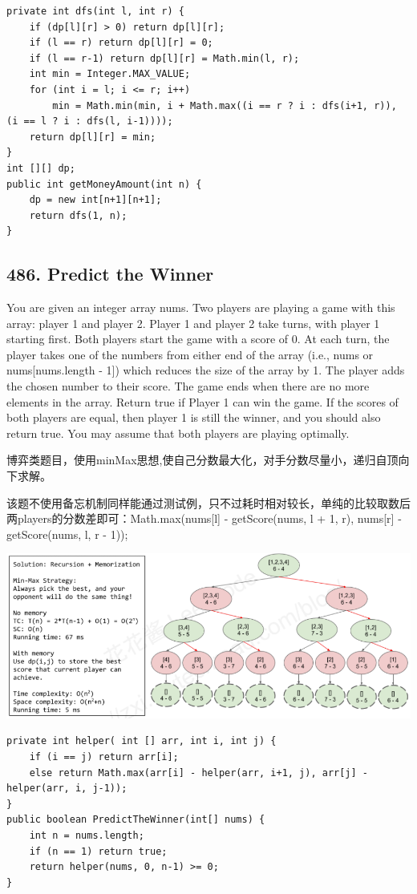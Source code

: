 \documentclass[9pt, b5paper]{article}
\begin{document}
\begin{verbatim}
private int dfs(int l, int r) {
    if (dp[l][r] > 0) return dp[l][r];
    if (l == r) return dp[l][r] = 0;
    if (l == r-1) return dp[l][r] = Math.min(l, r);
    int min = Integer.MAX_VALUE;
    for (int i = l; i <= r; i++) 
        min = Math.min(min, i + Math.max((i == r ? i : dfs(i+1, r)), (i == l ? i : dfs(l, i-1))));
    return dp[l][r] = min;
}
int [][] dp;
public int getMoneyAmount(int n) {
    dp = new int[n+1][n+1];
    return dfs(1, n);
}
\end{verbatim}

\subsection{486. Predict the Winner}
\label{sec-4-21}
You are given an integer array nums. Two players are playing a game with this array: player 1 and player 2.
Player 1 and player 2 take turns, with player 1 starting first. Both players start the game with a score of 0. At each turn, the player takes one of the numbers from either end of the array (i.e., nums\footnotemark[3]{} or nums[nums.length - 1]) which reduces the size of the array by 1. The player adds the chosen number to their score. The game ends when there are no more elements in the array.
Return true if Player 1 can win the game. If the scores of both players are equal, then player 1 is still the winner, and you should also return true. You may assume that both players are playing optimally.

博弈类题目，使用minMax思想,使自己分数最大化，对手分数尽量小，递归自顶向下求解。

该题不使用备忘机制同样能通过测试例，只不过耗时相对较长，单纯的比较取数后两players的分数差即可：Math.max(nums[l] - getScore(nums, l + 1, r), nums[r] - getScore(nums, l, r - 1));

\includegraphics[width=.9\linewidth]{./pic/predictWinner.png}

\begin{verbatim}
private int helper( int [] arr, int i, int j) {
    if (i == j) return arr[i];
    else return Math.max(arr[i] - helper(arr, i+1, j), arr[j] - helper(arr, i, j-1));
}
public boolean PredictTheWinner(int[] nums) {
    int n = nums.length;
    if (n == 1) return true;
    return helper(nums, 0, n-1) >= 0;
}
\end{verbatim}
\end{document}
